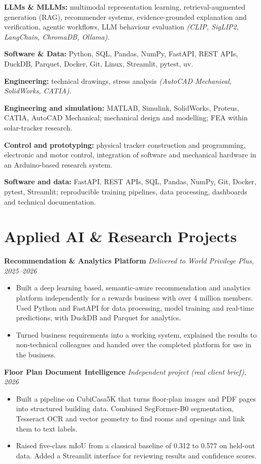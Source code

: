 \documentclass[10pt,a4paper]{article}
\let\cvOriginalTextbf\textbf
\renewcommand{\textbf}[1]{{\fontsize{10.5pt}{14pt}\selectfont\cvOriginalTextbf{#1}}}
\begin{document}
\textbf{LLMs \& MLLMs:} multimodal representation learning,
retrieval-augmented generation (RAG), recommender systems,
evidence-grounded explanation and verification, agentic workflows, LLM
behaviour evaluation \emph{(CLIP, SigLIP2, LangChain, ChromaDB,
Ollama)}.

\textbf{Software \& Data:} Python, SQL, Pandas, NumPy, FastAPI, REST
APIs, DuckDB, Parquet, Docker, Git, Linux, Streamlit, pytest, uv.

\textbf{Engineering:} technical drawings, stress analysis \emph{(AutoCAD
Mechanical, SolidWorks, CATIA)}.

\textbf{Engineering and simulation:} MATLAB, Simulink, SolidWorks, Proteus, CATIA, AutoCAD Mechanical; mechanical design and modelling; FEA within solar-tracker research.

\textbf{Control and prototyping:} physical tracker construction and programming, electronic and motor control, integration of software and mechanical hardware in an Arduino-based research system.

\textbf{Software and data:} FastAPI, REST APIs, SQL, Pandas, NumPy, Git, Docker, pytest, Streamlit; reproducible training pipelines, data processing, dashboards and technical documentation.

\section{Applied AI \& Research
Projects}\label{applied-ai-research-projects}

\textbf{Recommendation \& Analytics Platform} \emph{\textbar{} Delivered
to World Privilege Plus, 2025--2026}

\begin{itemize}
\item
  Built a deep learning based, semantic-aware recommendation and
  analytics platform independently for a rewards business with over 4
  million members. Used Python and FastAPI for data processing, model
  training and real-time predictions, with DuckDB and Parquet for
  analytics.
\item
  Turned business requirements into a working system, explained the
  results to non-technical colleagues and handed over the completed
  platform for use in the business.
\end{itemize}

\textbf{Floor Plan Document Intelligence} \emph{\textbar{} Independent
project (real client brief), 2026}

\begin{itemize}
\item
  Built a pipeline on CubiCasa5K that turns floor-plan images and PDF
  pages into structured building data. Combined SegFormer-B0
  segmentation, Tesseract OCR and vector geometry to find rooms and
  openings and link them to text labels.
\item
  Raised five-class mIoU from a classical baseline of 0.312 to 0.577 on
  held-out data. Added a Streamlit interface for reviewing results and
  confidence scores.
\end{itemize}
\end{document}
